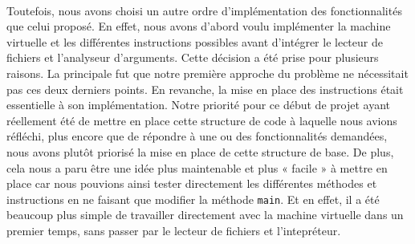 \documentclass[a4paper]{article}
\begin{document}
\paragraph{}Toutefois, nous avons choisi un autre ordre d'implémentation des fonctionnalités que celui proposé. En effet, nous avons d'abord voulu implémenter la machine virtuelle et les différentes instructions possibles avant d'intégrer le lecteur de fichiers et l'analyseur d'arguments.
Cette décision a été prise pour plusieurs raisons. La principale fut que notre première approche du problème ne nécessitait pas ces deux derniers points. En revanche, la mise en place des instructions était essentielle à son implémentation. Notre priorité pour ce début de projet ayant réellement été de mettre en place cette structure de code à laquelle nous avions réfléchi, plus encore que de répondre à une ou des fonctionnalités demandées, nous avons plutôt priorisé la mise en place de cette structure de base.
De plus, cela nous a paru être une idée plus maintenable et plus « facile » à mettre en place car nous pouvions ainsi tester directement les différentes méthodes et instructions en ne faisant que modifier la méthode \texttt{main}. Et en effet, il a été beaucoup plus simple de travailler directement avec la machine virtuelle dans un premier temps, sans passer par le lecteur de fichiers et l'intepréteur.
\end{document}
